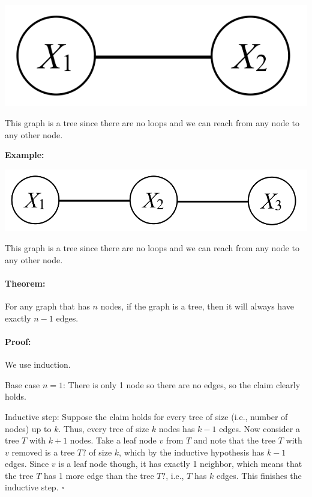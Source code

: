 \documentclass[6008notes.tex]{subfiles}
\begin{document}
{\centering\includegraphics[scale=0.4]{images_sec-graphical-models-2-rv-possibly-dependent} \par}

This graph is a tree since there are no loops and we can reach from any node to any other node.

\textbf{Example:}

{\centering\includegraphics[scale=0.4]{images_sec-graphical-models-3-rv-markov-chain} \par}

This graph is a tree since there are no loops and we can reach from any node to any other node.

\paragraph{Theorem:} For any graph that has $n$ nodes, if the graph is a tree, then it will always have exactly $n-1$ edges.

\paragraph{Proof:} We use induction.

Base case $n=1$: There is only 1 node so there are no edges, so the claim clearly holds.

Inductive step: Suppose the claim holds for every tree of size (i.e., number of nodes) up to $k$. Thus, every tree of size $k$ nodes has $k-1$ edges. Now consider a tree $T$ with $k+1$ nodes. Take a leaf node $v$ from $T$ and note that the tree $T$ with $v$ removed is a tree $T?$ of size $k$, which by the inductive hypothesis has $k-1$ edges. Since $v$ is a leaf node though, it has exactly 1 neighbor, which means that the tree $T$ has 1 more edge than the tree $T?$, i.e., $T$ has $k$ edges. This finishes the inductive step. $\square$
\end{document}
